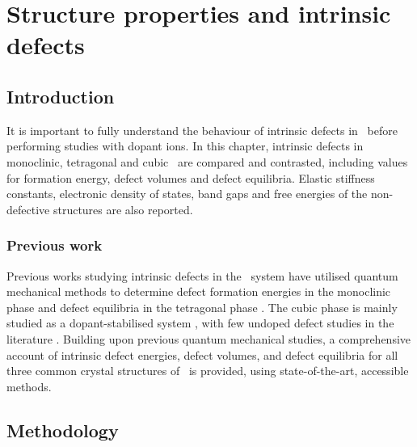 \chapter{Structure properties and intrinsic defects} \label{ch:results1}  

\label{ch:defects}

\section{Introduction}  

It is important to fully understand the behaviour of intrinsic defects in \zirconia\ before performing studies with dopant ions. In this chapter, intrinsic defects in monoclinic, tetragonal and cubic \zirconia\ are compared and contrasted, including values for formation energy, defect volumes and defect equilibria. Elastic stiffness constants, electronic density of states, band gaps and free energies of the non-defective structures are also reported. %

\subsection{Previous work} 

Previous works studying intrinsic defects in the \zirconia\ system have utilised quantum mechanical methods to determine defect formation energies in the monoclinic phase \cite{zheng2007first,foster2002modelling,foster2001structure} and defect equilibria in the tetragonal phase \cite{youssef2012intrinsic}. The cubic phase is mainly studied as a dopant-stabilised system \cite{orera1990intrinsic,jiang2011first}, with few undoped defect studies in the literature \cite{mackrodt1986theoretical,aarhammar2009energetics}. Building upon previous quantum mechanical studies, a comprehensive account of intrinsic defect energies, defect volumes, and defect equilibria for all three common crystal structures of \zirconia\ is provided, using state-of-the-art, accessible methods.

\section{Methodology}
